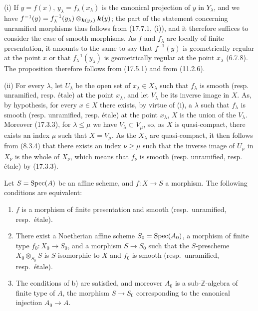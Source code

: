 (i) If $y=f(x)$, $y_\lambda=f_\lambda(x_\lambda)$ is the canonical projection of $y$ in $Y_\lambda$, and we have $f^{-1}(y)=f_\lambda^{-1}(y_\lambda)\otimes_{\boldsymbol{k}(y_\lambda)}\boldsymbol{k}(y)$; the part of the statement concerning unramified morphisms thus follows from (17.7.1, (i)), and it therefore suffices to consider the case of smooth morphisms. As $f$ and $f_\lambda$ are locally of finite presentation, it amounts to the same to say that $f^{-1}(y)$ is geometrically regular at the point $x$ or that $f_\lambda^{-1}(y_\lambda)$ is geometrically regular at the point $x_\lambda$ (6.7.8). The proposition therefore follows from (17.5.1) and from (11.2.6).

(ii) For every $\lambda$, let $U_\lambda$ be the open set of $x_\lambda\in X_\lambda$ such that $f_\lambda$ is smooth (resp. unramified, resp. étale) at the point $x_\lambda$, and let $V_\lambda$ be its inverse image in $X$. As, by hypothesis, for every $x\in X$ there exists, by virtue of (i), a $\lambda$ such that $f_\lambda$ is smooth (resp. unramified, resp. étale) at the point $x_\lambda$, $X$ is the union of the $V_\lambda$. Moreover (17.3.3), for $\lambda\leq\mu$ we have $V_\lambda\subset V_\mu$, so, as $X$ is quasi-compact, there exists an index $\mu$ such that $X=V_\mu$. As the $X_\lambda$ are quasi-compact, it then follows from (8.3.4) that there exists an index $\nu\geq\mu$ such that the inverse image of $U_\mu$ in $X_\nu$ is the whole of $X_\nu$, which means that $f_\nu$ is smooth (resp. unramified, resp. étale) by (17.3.3).

\begin{corollary}[17.7.9]
\label{IV.17.7.9}
Let $S=\operatorname{Spec}(A)$ be an affine scheme, and $f:X\to S$ a morphism. The following conditions are equivalent:
\begin{enumerate}
  \item[\textup{a)}] $f$ is a morphism of finite presentation and smooth \textup{(resp.}\ unramified, \textup{resp.}\ étale\textup{)}.


  \item[\textup{b)}] There exist a Noetherian affine scheme $S_0=\operatorname{Spec}(A_0)$, a morphism of finite type $f_0:X_0\to S_0$, and a morphism $S\to S_0$ such that the $S$-prescheme $X_0\otimes_{S_0}S$ is $S$-isomorphic to $X$ and $f_0$ is smooth \textup{(resp.}\ unramified, \textup{resp.}\ étale\textup{)}.
  \item[\textup{c)}] The conditions of \textup{b)} are satisfied, and moreover $A_0$ is a sub-$\mathbb{Z}$-algebra of finite type of $A$, the morphism $S\to S_0$ corresponding to the canonical injection $A_0\to A$.
\end{enumerate}
\end{corollary}


